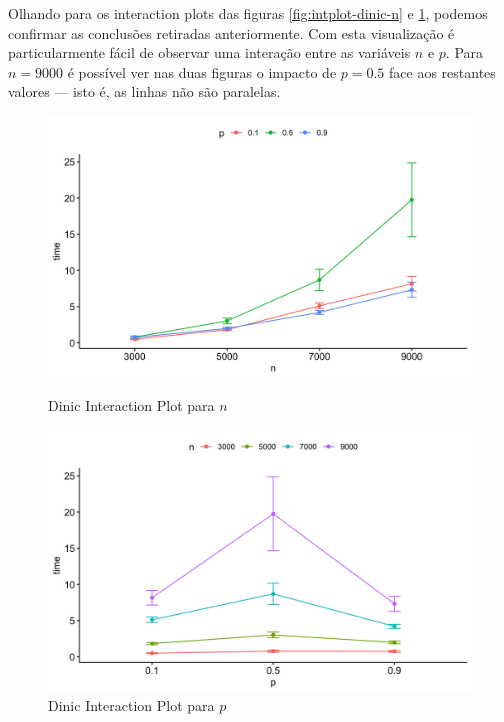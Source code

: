 \documentclass{uofa-eng-assignment}
\begin{document}
Olhando para os interaction plots das figuras \ref{fig:intplot-dinic-n} e \ref{fig:intplot-dinic-p}, podemos confirmar as conclusões retiradas anteriormente. Com esta visualização é particularmente fácil de observar uma interação entre as variáveis $n$ e $p$. Para $n = 9000$ é possível ver nas duas figuras o impacto de $p = 0.5$ face aos restantes valores --- isto é, as linhas não são paralelas.

\begin{figure}[h]
    \begin{minipage}{0.45\textwidth}
        \centering
        \includegraphics[width=1\linewidth]{intplot1.png}
        \caption{Dinic Interaction Plot para $n$}
        \label{fig:intplot-dinic-n}
    \end{minipage}\hfill
    \begin{minipage}{0.45\textwidth}
        \centering
        \includegraphics[width=1\linewidth]{intplot2.png}
        \caption{Dinic Interaction Plot para $p$}
        \label{fig:intplot-dinic-p}
    \end{minipage}
\end{figure}
\end{document}
